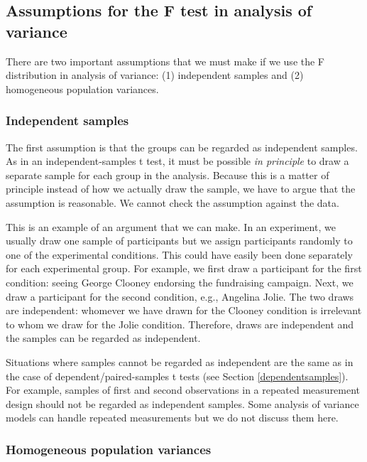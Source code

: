 \documentclass[a4paper]{book}
\theoremstyle{definition}
\theoremstyle{definition}
\theoremstyle{definition}
\theoremstyle{remark}
\begin{document}
\subsection{Assumptions for the F test in analysis of
variance}\label{anova-assumpt}

There are two important assumptions that we must make if we use the F
distribution in analysis of variance: (1) independent samples and (2)
homogeneous population variances.

\subsubsection{Independent samples}\label{independent-samples-1}

The first assumption is that the groups can be regarded as independent
samples. As in an independent-samples t test, it must be possible
\emph{in principle} to draw a separate sample for each group in the
analysis. Because this is a matter of principle instead of how we
actually draw the sample, we have to argue that the assumption is
reasonable. We cannot check the assumption against the data.

This is an example of an argument that we can make. In an experiment, we
usually draw one sample of participants but we assign participants
randomly to one of the experimental conditions. This could have easily
been done separately for each experimental group. For example, we first
draw a participant for the first condition: seeing George Clooney
endorsing the fundraising campaign. Next, we draw a participant for the
second condition, e.g., Angelina Jolie. The two draws are independent:
whomever we have drawn for the Clooney condition is irrelevant to whom
we draw for the Jolie condition. Therefore, draws are independent and
the samples can be regarded as independent.

Situations where samples cannot be regarded as independent are the same
as in the case of dependent/paired-samples t tests (see Section
\ref{dependentsamples}). For example, samples of first and second
observations in a repeated measurement design should not be regarded as
independent samples. Some analysis of variance models can handle
repeated measurements but we do not discuss them here.

\subsubsection{Homogeneous population
variances}\label{homogeneous-population-variances}
\end{document}
